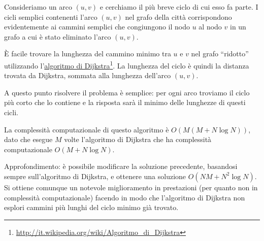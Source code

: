 Consideriamo un arco $(u, v)$ e cerchiamo il più breve ciclo di cui esso fa parte.
I cicli semplici contenenti l'arco $(u, v)$ nel grafo della città corrispondono evidentemente ai cammini semplici che congiungono il nodo $u$ al nodo $v$ in un grafo a cui è stato eliminato l'arco $(u, v)$.

È facile trovare la lunghezza del cammino minimo tra $u$ e $v$ nel grafo ``ridotto'' utilizzando l'\href{https://it.wikipedia.org/wiki/Algoritmo\_di\_Dijkstra}{algoritmo di Dijkstra}\footnote{\url{http://it.wikipedia.org/wiki/Algoritmo_di_Dijkstra}}. La lunghezza del ciclo è quindi la distanza trovata da Dijkstra, sommata alla lunghezza dell'arco $(u, v)$.

A questo punto risolvere il problema è semplice: per ogni arco troviamo il ciclo più corto che lo contiene e la risposta sarà il minimo delle lunghezze di questi cicli.

La complessità computazionale di questo algoritmo è $O(M(M+N\log N))$, dato che esegue $M$ volte l'algoritmo di Dijkstra che ha complessità computazionale $O(M+N\log N)$.

Approfondimento: è possibile modificare la soluzione precedente, basandosi sempre sull'algoritmo di Dijkstra, e ottenere una soluzione $O(NM + N^2\log N)$. Si ottiene comunque un notevole miglioramento in prestazioni (per quanto non in complessità computazionale) facendo in modo che l'algoritmo di Dijkstra non esplori cammini più lunghi del ciclo minimo già trovato.

\Codice

\colorbox{white}{}
\colorbox{white}{}
